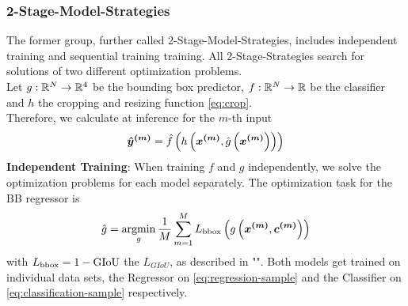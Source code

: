 \subsubsection{2-Stage-Model-Strategies}\label{subsubsec:2-model-strategy}
The former group, further called 2-Stage-Model-Strategies, includes independent training and sequential training training. All 2-Stage-Strategies search for solutions of two different optimization problems.\\
Let  $g: \mathbb{R}^{N} \rightarrow \mathbb{R}^{4}$ be the bounding box predictor, $f: \mathbb{R}^{N} \rightarrow \mathbb{R}$ be the classifier and $h$ the cropping and resizing function \eqref{eq:crop}.\\
Therefore, we calculate at inference for the $m$-th input
\begin{align}
    \bm{\hat{y}^{(m)}} =
    \hat{f}\left(
        h\left(
            \bm{x^{(m)}},
            \hat{g}\left(
                \bm{x^{(m)}}
            \right)
        \right)
    \right)
\end{align}
\textbf{Independent Training}:
When training $f$ and $g$ independently, we solve the optimization problems for each model separately.
The optimization task for the BB regressor is
\begin{align}
    \hat{g} =
    \operatorname*{argmin}_g
    \frac{1}{M}
    \sum \limits_{m=1}^M
        L_{\text{bbox}}\left(
            g\left(
                \bm{x^{(m)}},
                \bm{c^{(m)}}
            \right)
        \right)
    \label{eq:independent-g-loss}
\end{align}
with $L_{\text{bbox}} = 1 - \text{GIoU}$ the $L_{GIoU}$, as described in "".
Both models get trained on individual data sets, the Regressor on \eqref{eq:regression-sample} and the Classifier on \eqref{eq:classification-sample} respectively.

